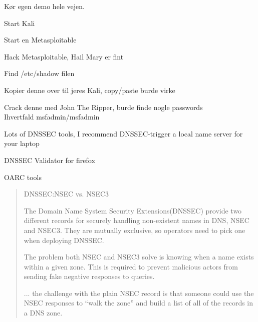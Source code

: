 \documentclass[20pt,landscape,a4paper,footrule]{foils}
\begin{document}
\centerline{}



Kør egen demo hele vejen.

\begin{list2}
\item Start Kali
\item Start en Metasploitable
\item Hack Metasploitable, Hail Mary er fint \smiley
\item Find /etc/shadow filen
\item Kopier denne over til jeres Kali, copy/paste burde virke
\item Crack denne med John The Ripper, burde finde nogle passwords\\
Ihvertfald msfadmin/msfadmin
\end{list2}



Lots of DNSSEC tools, I recommend DNSSEC-trigger a local name server for your laptop

\begin{list2}
\item DNSSEC Validator for firefox\\ 
\item OARC tools 
\item {}
\end{list2}


\begin{quote}
DNSSEC:NSEC vs. NSEC3

The Domain Name System Security Extensions(DNSSEC) provide two different records for securely handling non-existent names in DNS, NSEC and NSEC3. They are mutually exclusive, so operators need to pick one when deploying DNSSEC.

The problem both NSEC and NSEC3 solve is knowing when a name exists within a given zone. This is required to prevent malicious actors from sending fake negative responses to queries.

... the challenge with the plain NSEC record is that someone could use the NSEC responses to “walk the zone” and build a list of all of the records in a DNS zone.
\end{quote}
\end{document}

